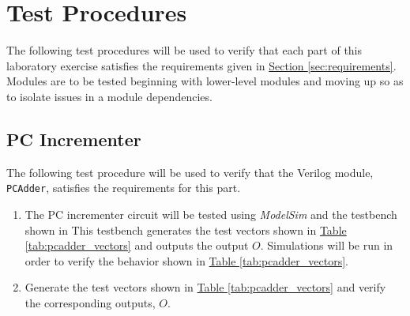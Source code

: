\section{Test Procedures} %
\label{sec:test_procedures}

The following test procedures will be used to verify that each part of this laboratory exercise satisfies the requirements given in \hyperref[sec:requirements]{Section \ref*{sec:requirements}}.
Modules are to be tested beginning with lower-level modules and moving up so as to isolate issues in a module dependencies.

\subsection{PC Incrementer} %
\label{sub:pc_incrementer_procedure}

The following test procedure will be used to verify that the Verilog module, \verb|PCAdder|, satisfies the requirements for this part.

\begin{enumerate}
    \item The PC incrementer circuit will be tested using \emph{ModelSim} and the testbench shown in %
    This testbench generates the test vectors shown in \hyperref[tab:pcadder_vectors]{Table \ref*{tab:pcadder_vectors}} and outputs the output $O$.
    Simulations will be run in order to verify the behavior shown in \hyperref[tab:pcadder_vectors]{Table \ref*{tab:pcadder_vectors}}.
    \item Generate the test vectors shown in \hyperref[tab:pcadder_vectors]{Table \ref*{tab:pcadder_vectors}} and verify the corresponding outputs, $O$.
\end{enumerate}

